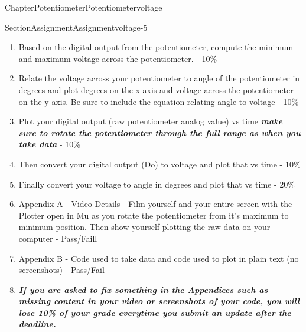 \documentclass[oneside,10pt,]{book}
\newcommand{\alert}[1]{\textbf{\textit{#1}}}
\numberwithin{equation}{section}
\begin{document}
\begin{chapterptx}{Chapter}{Potentiometer}{}{Potentiometer}{}{}{voltage}
\begin{sectionptx}{Section}{Assignment}{}{Assignment}{}{}{voltage-5}
\begin{introduction}{}
\begin{enumerate}
\item{}Based on the digital output from the potentiometer, compute the minimum and maximum voltage across the potentiometer. - 10\%%
\item{}Relate the voltage across your potentiometer to angle of the potentiometer in degrees and plot degrees on the x-axis and voltage across the potentiometer on the y-axis. Be sure to include the equation relating angle to voltage - 10\%%
\item{}Plot your digital output (raw potentiometer analog value) vs time \alert{make sure to rotate the potentiometer through the full range as when you take data} - 10\%%
\item{}Then convert your digital output (Do) to voltage and plot that vs time - 10\%%
\item{}Finally convert your voltage to angle in degrees and plot that vs time - 20\%%
\item{}Appendix A - Video Details - Film yourself and your entire screen with the Plotter open in Mu as you rotate the potentiometer from it's maximum to minimum position. Then show yourself plotting the raw data on your computer - Pass\slash{}Faill%
\item{}Appendix B - Code used to take data and code used to plot in plain text (no screenshots) - Pass\slash{}Fail%
\item{}\alert{If you are asked to fix something in the Appendices such as missing content in your video or screenshots of your code, you will lose 10\% of your grade everytime you submit an update after the deadline.}%
\end{enumerate}
\end{introduction}%
\end{sectionptx}
\end{chapterptx}
%
%
\typeout{************************************************}
\typeout{************************************************}
%
\end{document}
